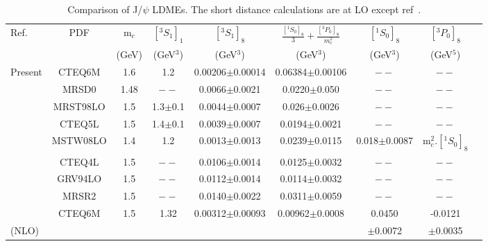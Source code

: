 \documentclass[aps,prc,preprint,superscriptaddress,showpacs,showkeys,amsmath]{revtex4-1}
\begin{document}
\begin{enumerate}
{\begin{table}[h]
\caption{Comparison of J/$\psi$ LDMEs. The short distance calculations are at LO except ref~\cite{Butenschoen:2010rq}.}
\begin{tabular}{|l|c|c|c|c|c|c|c|c|}
\hline            
Ref.                             &PDF     &m$_{c}$  &$[^3S_1]_{1}$    &$[^3S_1]_{8}$        &$\frac{[^1S_{0}]_{8}}{3}+\frac{[^3P_0]_{8}}{m_{c}^2}$ &$[^1S_0]_{8}$   &$[^3P_0]_{8}$\\
                                &        &(GeV)   &(GeV$^3$)       &(GeV$^3$)           &(GeV$^3$)                                         &(GeV$^3$)      &(GeV$^5$)\\ 
\hline
Present                        &CTEQ6M   &1.6     &1.2            &0.00206$\pm$0.00014  &0.06384$\pm$0.00106                              &$--$           &$--$\\
\cite{Cho:1995vh}              &MRSD0    &1.48    &$--$           &0.0066$\pm$0.0021    &0.0220$\pm$0.050                                 &$--$           &$--$ \\
\cite{Braaten:1999qk}          &MRST98LO &1.5     &1.3$\pm$0.1    &0.0044$\pm$0.0007    &0.026$\pm$0.0026                                 &$--$           &$--$\\
\cite{Braaten:1999qk}          &CTEQ5L   &1.5     &1.4$\pm$0.1    &0.0039$\pm$0.0007    &0.0194$\pm$0.0021                                &$--$           &$--$\\
\cite{Sharma:2012dy}           &MSTW08LO &1.4      &1.2            &0.0013$\pm$0.0013    &0.0239$\pm$0.0115                                &0.018$\pm$0.0087&m$_{c}^{2}.[^1S_0]_{8}$ \\
\cite{Beneke:1996yw}            &CTEQ4L   &1.5     &$--$           &0.0106$\pm$0.0014   &0.0125$\pm$0.0032                                &$--$            &$--$ \\
\cite{Beneke:1996yw}            &GRV94LO  &1.5     &$--$           &0.0112$\pm$0.0014   &0.0114$\pm$0.0032                                &$--$            &$--$ \\
\cite{Beneke:1996yw}            &MRSR2    &1.5     &$--$           &0.0140$\pm$0.0022   &0.0311$\pm$0.0059                                &$--$            &$--$ \\
\cite{Butenschoen:2010rq}      &CTEQ6M   &1.5     &1.32           &0.00312$\pm$0.00093 &0.00962$\pm$0.0008                               &0.0450           &-0.0121 \\
                        (NLO)  &    &      &             &     &                                                                         &$\pm$0.0072      &$\pm$0.0035\\
\hline
\end{tabular}
\label{table:LDMEJPsi}
\end{table}

}
\end{enumerate}
\end{document}
